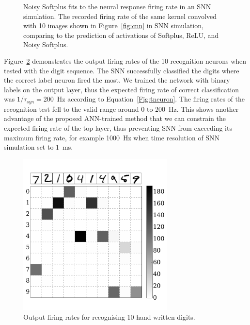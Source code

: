 \begin{figure}[tbh!]
\begin{subfigure}[t]{0.6\textwidth}
		\end{subfigure}
		\caption{
			Noisy Softplus fits to the neural response firing rate in an SNN simulation.
			The recorded firing rate of the same kernel convolved with 10 images shown in Figure~\ref{fig:cnn} in SNN simulation, comparing to the prediction of activations of Softplus, ReLU, and Noisy Softplus.}
		\label{fig:af_compare}
	\end{figure}
	
	Figure~\ref{Fig:out} demonstrates the output firing rates of the 10 recognition neurons when tested with the digit sequence.
	The SNN successfully classified the digits where the correct label neuron fired the most.
	We trained the network with binary labels on the output layer, thus the expected firing rate of correct classification was $1/\tau_{syn}=200$~Hz according to Equation~\ref{Fig:tneuron}.
	The firing rates of the recognition test fell to the valid range around 0 to 200~Hz.
	This shows another advantage of the proposed ANN-trained method that we can constrain the expected firing rate of the top layer, thus preventing SNN from exceeding its maximum firing rate, for example 1000~Hz when time resolution of SNN simulation set to 1~ms.
	
		\begin{figure}[tbp!]
			\centering
			\includegraphics[width=0.7\textwidth]{pics_iconip/7.pdf}
			\caption{Output firing rates for recognising 10 hand written digits.}
			\label{Fig:out}
		\end{figure}
	
